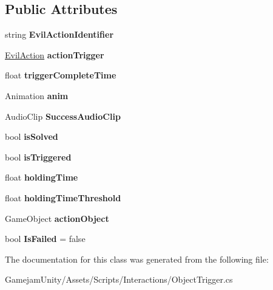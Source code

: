 \subsection*{Public Attributes}
\begin{DoxyCompactItemize}
\item 
\mbox{\label{class_object_trigger_ab61adc34c964e2c0501916db38037b42}} 
string {\bfseries Evil\+Action\+Identifier}
\item 
\mbox{\label{class_object_trigger_a85ea5cd5631d10a550ead9f4df09326d}} 
\mbox{\hyperlink{class_evil_action}{Evil\+Action}} {\bfseries action\+Trigger}
\item 
\mbox{\label{class_object_trigger_a3ce264e11707107314287b607db48744}} 
float {\bfseries trigger\+Complete\+Time}
\item 
\mbox{\label{class_object_trigger_a16c2d109311b086fb1320e75c69ab36c}} 
Animation {\bfseries anim}
\item 
\mbox{\label{class_object_trigger_a7d96768a3ecc88b04b2b77e1e640f56d}} 
Audio\+Clip {\bfseries Success\+Audio\+Clip}
\item 
\mbox{\label{class_object_trigger_a099869c27d33968b94f87c8f095a6891}} 
bool {\bfseries is\+Solved}
\item 
\mbox{\label{class_object_trigger_a068f1c5710685caaafceef6d7856f1fd}} 
bool {\bfseries is\+Triggered}
\item 
\mbox{\label{class_object_trigger_a220651fe5c130544bd82b56b326f8c30}} 
float {\bfseries holding\+Time}
\item 
\mbox{\label{class_object_trigger_a817814665c0cbe18a37ff1082feb0a8f}} 
float {\bfseries holding\+Time\+Threshold}
\item 
\mbox{\label{class_object_trigger_adca7ea0f51c98d9cd8fe6f17fa7c4643}} 
Game\+Object {\bfseries action\+Object}
\item 
\mbox{\label{class_object_trigger_a8c1f6c7625fad597e8a8ff2f17bb4f01}} 
bool {\bfseries Is\+Failed} = false
\end{DoxyCompactItemize}


The documentation for this class was generated from the following file\+:\begin{DoxyCompactItemize}
\item 
Gamejam\+Unity/\+Assets/\+Scripts/\+Interactions/Object\+Trigger.\+cs\end{DoxyCompactItemize}
